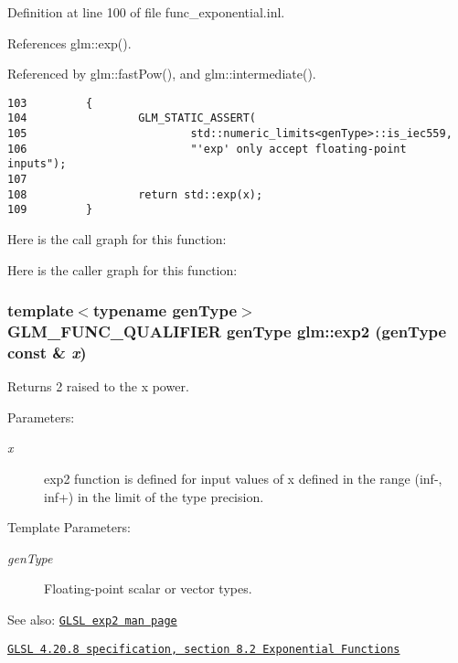 Definition at line 100 of file func\_\-exponential.inl.

References glm::exp().

Referenced by glm::fastPow(), and glm::intermediate().

\begin{Code}\begin{verbatim}103         {
104                 GLM_STATIC_ASSERT(
105                         std::numeric_limits<genType>::is_iec559,
106                         "'exp' only accept floating-point inputs");
107 
108                 return std::exp(x);
109         }
\end{verbatim}
\end{Code}




Here is the call graph for this function:

Here is the caller graph for this function:\hypertarget{group__core__func__exponential_g85f6efedaa47799e8f406481baca2171}{
\subsubsection[exp2]{\setlength{\rightskip}{0pt plus 5cm}template$<$typename genType$>$ GLM\_\-FUNC\_\-QUALIFIER genType glm::exp2 (genType const \& {\em x})}}
\label{group__core__func__exponential_g85f6efedaa47799e8f406481baca2171}


Returns 2 raised to the x power.

\begin{Desc}
\item[Parameters:]
\begin{description}
\item[{\em x}]exp2 function is defined for input values of x defined in the range (inf-, inf+) in the limit of the type precision. \end{description}
\end{Desc}
\begin{Desc}
\item[Template Parameters:]
\begin{description}
\item[{\em genType}]Floating-point scalar or vector types.\end{description}
\end{Desc}
\begin{Desc}
\item[See also:]\href{http://www.opengl.org/sdk/docs/manglsl/xhtml/exp2.xml}{\tt GLSL exp2 man page} 

\href{http://www.opengl.org/registry/doc/GLSLangSpec.4.20.8.pdf}{\tt GLSL 4.20.8 specification, section 8.2 Exponential Functions} \end{Desc}


